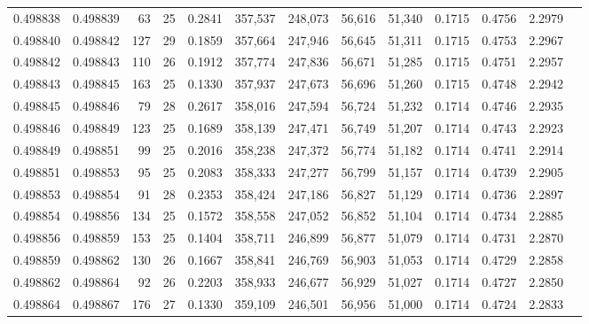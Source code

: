 \begin{tabular}{rrrrrrrrrrrrr}
0.498838 & 0.498839 &  63 &  25 &                                     0.2841 & 357,537 & 248,073 &  56,616 &  51,340 & 0.1715 & 0.4756 & 2.2979 \\
0.498840 & 0.498842 & 127 &  29 &                                     0.1859 & 357,664 & 247,946 &  56,645 &  51,311 & 0.1715 & 0.4753 & 2.2967 \\
0.498842 & 0.498843 & 110 &  26 &                                     0.1912 & 357,774 & 247,836 &  56,671 &  51,285 & 0.1715 & 0.4751 & 2.2957 \\
0.498843 & 0.498845 & 163 &  25 &                                     0.1330 & 357,937 & 247,673 &  56,696 &  51,260 & 0.1715 & 0.4748 & 2.2942 \\
0.498845 & 0.498846 &  79 &  28 &                                     0.2617 & 358,016 & 247,594 &  56,724 &  51,232 & 0.1714 & 0.4746 & 2.2935 \\
0.498846 & 0.498849 & 123 &  25 &                                     0.1689 & 358,139 & 247,471 &  56,749 &  51,207 & 0.1714 & 0.4743 & 2.2923 \\
0.498849 & 0.498851 &  99 &  25 &                                     0.2016 & 358,238 & 247,372 &  56,774 &  51,182 & 0.1714 & 0.4741 & 2.2914 \\
0.498851 & 0.498853 &  95 &  25 &                                     0.2083 & 358,333 & 247,277 &  56,799 &  51,157 & 0.1714 & 0.4739 & 2.2905 \\
0.498853 & 0.498854 &  91 &  28 &                                     0.2353 & 358,424 & 247,186 &  56,827 &  51,129 & 0.1714 & 0.4736 & 2.2897 \\
0.498854 & 0.498856 & 134 &  25 &                                     0.1572 & 358,558 & 247,052 &  56,852 &  51,104 & 0.1714 & 0.4734 & 2.2885 \\
0.498856 & 0.498859 & 153 &  25 &                                     0.1404 & 358,711 & 246,899 &  56,877 &  51,079 & 0.1714 & 0.4731 & 2.2870 \\
0.498859 & 0.498862 & 130 &  26 &                                     0.1667 & 358,841 & 246,769 &  56,903 &  51,053 & 0.1714 & 0.4729 & 2.2858 \\
0.498862 & 0.498864 &  92 &  26 &                                     0.2203 & 358,933 & 246,677 &  56,929 &  51,027 & 0.1714 & 0.4727 & 2.2850 \\
0.498864 & 0.498867 & 176 &  27 &                                     0.1330 & 359,109 & 246,501 &  56,956 &  51,000 & 0.1714 & 0.4724 & 2.2833 \\

\end{tabular}
